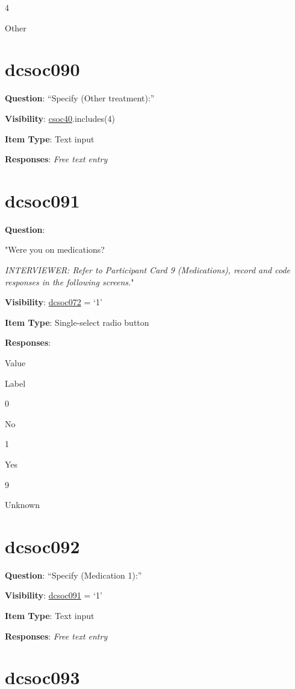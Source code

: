 \documentclass[]{book}
\begin{document}
4

Other

\hypertarget{dcsoc090}{%
\section{dcsoc090}\label{dcsoc090}}

\textbf{Question}: ``Specify (Other treatment):''

\textbf{Visibility}: \protect\hyperlink{csoc40}{csoc40}.includes(4)

\textbf{Item Type}: Text input

\textbf{Responses}: \emph{Free text entry}

\hypertarget{dcsoc091}{%
\section{dcsoc091}\label{dcsoc091}}

\textbf{Question}:

"Were you on medications?

\emph{INTERVIEWER: Refer to Participant Card 9 (Medications), record and code responses in the following screens.}"

\textbf{Visibility}: \protect\hyperlink{dcsoc072}{dcsoc072} = `1'

\textbf{Item Type}: Single-select radio button

\textbf{Responses}:

Value

Label

0

No

1

Yes

9

Unknown

\hypertarget{dcsoc092}{%
\section{dcsoc092}\label{dcsoc092}}

\textbf{Question}: ``Specify (Medication 1):''

\textbf{Visibility}: \protect\hyperlink{dcsoc091}{dcsoc091} = `1'

\textbf{Item Type}: Text input

\textbf{Responses}: \emph{Free text entry}

\hypertarget{dcsoc093}{%
\section{dcsoc093}\label{dcsoc093}}
\end{document}
